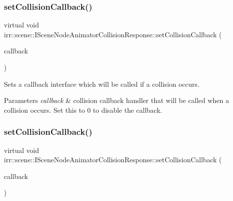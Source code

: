 \subsubsection{\texorpdfstring{set\+Collision\+Callback()}{setCollisionCallback()}\hspace{0.1cm}{\footnotesize\ttfamily [1/2]}}
{\footnotesize\ttfamily virtual void irr\+::scene\+::\+I\+Scene\+Node\+Animator\+Collision\+Response\+::set\+Collision\+Callback (\begin{DoxyParamCaption}\item[{\hyperlink{classirr_1_1scene_1_1ICollisionCallback}{I\+Collision\+Callback} $\ast$}]{callback }\end{DoxyParamCaption})\hspace{0.3cm}{\ttfamily [pure virtual]}}



Sets a callback interface which will be called if a collision occurs. 


\begin{DoxyParams}{Parameters}
{\em callback} & collision callback handler that will be called when a collision occurs. Set this to 0 to disable the callback. \\
\hline
\end{DoxyParams}
\mbox{\label{classirr_1_1scene_1_1ISceneNodeAnimatorCollisionResponse_a2b97f977b446200c5dd22230aec5d275}} 
\subsubsection{\texorpdfstring{set\+Collision\+Callback()}{setCollisionCallback()}\hspace{0.1cm}{\footnotesize\ttfamily [2/2]}}
{\footnotesize\ttfamily virtual void irr\+::scene\+::\+I\+Scene\+Node\+Animator\+Collision\+Response\+::set\+Collision\+Callback (\begin{DoxyParamCaption}\item[{\hyperlink{classirr_1_1scene_1_1ICollisionCallback}{I\+Collision\+Callback} $\ast$}]{callback }\end{DoxyParamCaption})\hspace{0.3cm}{\ttfamily [pure virtual]}}



